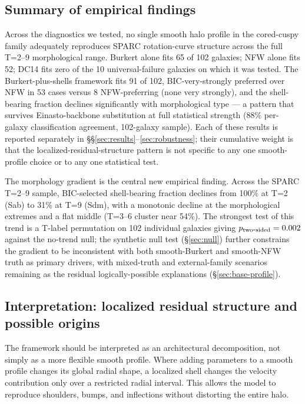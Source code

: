 \subsection{Summary of empirical findings}

Across the diagnostics we tested, no single smooth halo profile in the cored-cuspy family adequately reproduces SPARC rotation-curve structure across the full T=2--9 morphological range. Burkert alone fits 65 of 102 galaxies; NFW alone fits 52; DC14 fits zero of the 10 universal-failure galaxies on which it was tested. The Burkert-plus-shells framework fits 91 of 102, BIC-very-strongly preferred over NFW in 53 cases versus 8 NFW-preferring (none very strongly), and the shell-bearing fraction declines significantly with morphological type --- a pattern that survives Einasto-backbone substitution at full statistical strength (88\% per-galaxy classification agreement, 102-galaxy sample). Each of these results is reported separately in \S\S\ref{sec:results}--\ref{sec:robustness}; their cumulative weight is that the localized-residual-structure pattern is not specific to any one smooth-profile choice or to any one statistical test.

The morphology gradient is the central new empirical finding. Across the SPARC T=2--9 sample, BIC-selected shell-bearing fraction declines from 100\% at T=2 (Sab) to 31\% at T=9 (Sdm), with a monotonic decline at the morphological extremes and a flat middle (T=3--6 cluster near 54\%). The strongest test of this trend is a T-label permutation on 102 individual galaxies giving $p_{\rm two\mbox{-}sided} = 0.002$ against the no-trend null; the synthetic null test (\S\ref{sec:null}) further constrains the gradient to be inconsistent with both smooth-Burkert and smooth-NFW truth as primary drivers, with mixed-truth and external-family scenarios remaining as the residual logically-possible explanations (\S\ref{sec:base-profile}).

\subsection{Interpretation: localized residual structure and possible origins}
\label{sec:interpretation}

The framework should be interpreted as an architectural decomposition, not simply as a more flexible smooth profile. Where adding parameters to a smooth profile changes its global radial shape, a localized shell changes the velocity contribution only over a restricted radial interval. This allows the model to reproduce shoulders, bumps, and inflections without distorting the entire halo.

